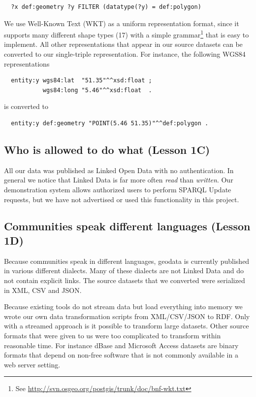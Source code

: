 \documentclass[a4paper]{scrartcl}
\newcommand{\seeUrl}[1]{\footnote{See \mbox{\url{#1}}}}
\begin{document}
\begin{verbatim}
  ?x def:geometry ?y FILTER (datatype(?y) = def:polygon)
\end{verbatim}

We use Well-Known Text (WKT) as a uniform representation format, since
it supports many different shape types (17) with a simple
grammar\seeUrl{http://svn.osgeo.org/postgis/trunk/doc/bnf-wkt.txt}
that is easy to implement.  All other representations that appear in
our source datasets can be converted to our single-triple
representation.  For instance, the following WGS84 representations

\begin{verbatim}
  entity:y wgs84:lat  "51.35"^^xsd:float ;
           wgs84:long "5.46"^^xsd:float  .
\end{verbatim}

is converted to

\begin{verbatim}
  entity:y def:geometry "POINT(5.46 51.35)"^^def:polygon .
\end{verbatim} 


\subsection{Who is allowed to do what (Lesson 1C)}

All our data was published as Linked Open Data with no authentication.
In general we notice that Linked Data is far more often \emph{read}
than \emph{written}.  Our demonstration system allows authorized users
to perform SPARQL Update requests, but we have not advertised or used
this functionality in this project.


\subsection{Communities speak different languages (Lesson 1D)}
\label{sec:conversion}
\label{sec:enrichment}
\label{sec:transformation}

Because communities speak in different languages, geodata is currently
published in various different dialects.  Many of these dialects are
not Linked Data and do not contain explicit links.  The source
datasets that we converted were serialized in XML, CSV and JSON.

Because existing tools do not stream data but load everything into
memory we wrote our own data transformation scripts from XML/CSV/JSON
to RDF.  Only with a streamed approach is it possible to transform
large datasets.  Other source formats that were given to us were too
complicated to transform within reasonable time.  For instance dBase
and Microsoft Access datasets are binary formats that depend on
non-free software that is not commonly available in a web server
setting.
\end{document}
